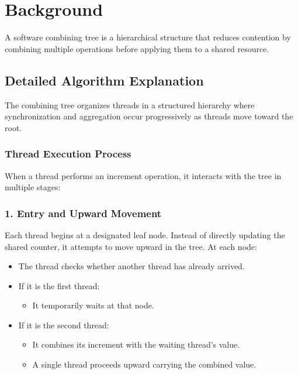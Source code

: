 \documentclass[11pt,a4paper]{article}
\begin{document}
\section{Background}
\label{sec:background}

A software combining tree is a hierarchical structure that reduces contention by combining multiple operations before applying them to a shared resource.

\subsection{Detailed Algorithm Explanation}

The combining tree organizes threads in a structured hierarchy where synchronization and aggregation occur progressively as threads move toward the root.

\subsubsection*{Thread Execution Process}

When a thread performs an increment operation, it interacts with the tree in multiple stages:

\subsubsection*{1. Entry and Upward Movement}

Each thread begins at a designated leaf node. Instead of directly updating the shared counter, it attempts to move upward in the tree. At each node:

\begin{itemize}
    \item The thread checks whether another thread has already arrived.
    \item If it is the first thread:
    \begin{itemize}
        \item It temporarily waits at that node.
    \end{itemize}
    \item If it is the second thread:
    \begin{itemize}
        \item It combines its increment with the waiting thread’s value.
        \item A single thread proceeds upward carrying the combined value.
    \end{itemize}
\end{itemize}
\end{document}
